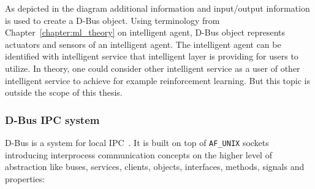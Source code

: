 \documentclass[english, 12pt, a4paper, elec, utf8, online]{aaltothesis}
\begin{document}
As depicted in the diagram additional information and input/output information is used to create a D-Bus object. Using terminology from Chapter~\ref{chapter:ml_theory} on intelligent agent, D-Bus object represents actuators and sensors of an intelligent agent. The intelligent agent can be identified with intelligent service that intelligent layer is providing for users to utilize. In theory, one could consider other intelligent service as a user of other intelligent service to achieve for example reinforcement learning. But this topic is outside the scope of this thesis.           

\subsubsection{D-Bus IPC system}
D-Bus is a system for local IPC~\cite{dbus_spec}. It is built on top of \texttt{AF\_UNIX} sockets introducing interprocess communication concepts on the higher level of abstraction  like buses, services, clients, objects, interfaces, methods, signals and properties:  
    
\end{document}
